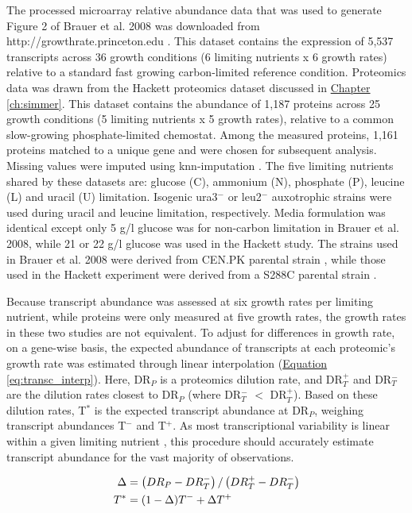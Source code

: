 The processed microarray relative abundance data that was used to generate Figure 2 of Brauer et al. 2008 was downloaded from http://growthrate.princeton.edu \cite{Brauer:2008jn}.  This dataset contains the expression of 5,537 transcripts across 36 growth conditions (6 limiting nutrients x 6 growth rates) relative to a standard fast growing carbon-limited reference condition. Proteomics data was drawn from the Hackett proteomics dataset discussed in \hyperref[ch:simmer]{Chapter \ref{ch:simmer}}. This dataset contains the abundance of 1,187 proteins across 25 growth conditions (5 limiting nutrients x 5 growth rates), relative to a common slow-growing phosphate-limited chemostat. Among the measured proteins, 1,161 proteins matched to a unique gene and were chosen for subsequent analysis. Missing values were imputed using knn-imputation \cite{Troyanskaya:2001uh}. The five limiting nutrients shared by these datasets are: glucose (C), ammonium (N), phosphate (P), leucine (L) and uracil (U) limitation. Isogenic ura3$^{-}$ or leu2$^{-}$ auxotrophic strains were used during uracil and leucine limitation, respectively. Media formulation was identical except only 5 g/l glucose was for non-carbon limitation in Brauer et al. 2008, while 21 or 22 g/l glucose was used in the Hackett study. The strains used in Brauer et al. 2008 were derived from CEN.PK parental strain \cite{vanDijkenJP:2000er}, while those used in the Hackett experiment were derived from a S288C parental strain \cite{Winston:1995io}.

Because transcript abundance was assessed at six growth rates per limiting nutrient, while proteins were only measured at five growth rates, the growth rates in these two studies are not equivalent. To adjust for differences in growth rate, on a gene-wise basis, the expected abundance of transcripts at each proteomic's growth rate was estimated through linear interpolation (\hyperref[eq:transc_interp]{Equation \ref{eq:transc_interp}}). Here, DR$_{P}$ is a proteomics dilution rate, and DR$_{T}^{+}$ and DR$_{T}^{-}$ are the dilution rates closest to DR$_{P}$ (where DR$_{T}^{-}$ $<$ DR$_{T}^{+}$). Based on these dilution rates, T$^{*}$ is the expected transcript abundance at DR$_{P}$, weighing transcript abundances T$^{-}$ and T$^{+}$. As most transcriptional variability is linear within a given limiting nutrient \cite{Brauer:2008jn}, this procedure should accurately estimate transcript abundance for the vast majority of observations. 

\begin{align}
\Delta &= \left(DR_{P} - DR_{T}^{-}\right) / \left(DR_{T}^{+} - DR_{T}^{-}\right)\notag\\
T^{*} &= (1-\Delta)T^{-} + \Delta T^{+}\label{eq:transc_interp}
\end{align}

